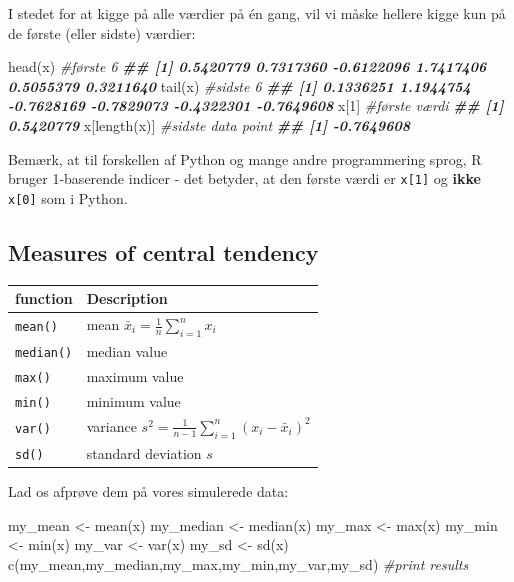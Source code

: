 \documentclass[
]{book}
\newenvironment{Shaded}{\begin{snugshade}}{\end{snugshade}}
\newcommand{\CommentTok}[1]{\textcolor[rgb]{0.56,0.35,0.01}{\textit{#1}}}
\newcommand{\DecValTok}[1]{\textcolor[rgb]{0.00,0.00,0.81}{#1}}
\newcommand{\DocumentationTok}[1]{\textcolor[rgb]{0.56,0.35,0.01}{\textbf{\textit{#1}}}}
\newcommand{\FunctionTok}[1]{\textcolor[rgb]{0.00,0.00,0.00}{#1}}
\newcommand{\NormalTok}[1]{#1}
\newcommand{\OtherTok}[1]{\textcolor[rgb]{0.56,0.35,0.01}{#1}}
\begin{document}
I stedet for at kigge på alle værdier på én gang, vil vi måske hellere kigge kun på de første (eller sidste) værdier:

\begin{Shaded}
\begin{Highlighting}[]
\FunctionTok{head}\NormalTok{(x) }\CommentTok{\#første 6}
\DocumentationTok{\#\# [1]  0.5420779  0.7317360 {-}0.6122096  1.7417406  0.5055379  0.3211640}
\FunctionTok{tail}\NormalTok{(x) }\CommentTok{\#sidste 6}
\DocumentationTok{\#\# [1]  0.1336251  1.1944754 {-}0.7628169 {-}0.7829073 {-}0.4322301 {-}0.7649608}
\NormalTok{x[}\DecValTok{1}\NormalTok{] }\CommentTok{\#første værdi}
\DocumentationTok{\#\# [1] 0.5420779}
\NormalTok{x[}\FunctionTok{length}\NormalTok{(x)] }\CommentTok{\#sidste data point}
\DocumentationTok{\#\# [1] {-}0.7649608}
\end{Highlighting}
\end{Shaded}

Bemærk, at til forskellen af Python og mange andre programmering sprog, R bruger 1-baserende indicer - det betyder, at den første værdi er \texttt{x{[}1{]}} og \textbf{ikke} \texttt{x{[}0{]}} som i Python.

\hypertarget{measures-of-central-tendency}{%
\subsection{Measures of central tendency}\label{measures-of-central-tendency}}

\begin{longtable}[]{@{}ll@{}}
\toprule
function & Description \\
\midrule
\endhead
\texttt{mean()} & mean \(\bar{x}_{i} = \frac{1}{n}\sum_{i=1}^{n} x_{i}\) \\
\texttt{median()} & median value \\
\texttt{max()} & maximum value \\
\texttt{min()} & minimum value \\
\texttt{var()} & variance \(s^2 = \frac{1}{n-1}\sum_{i=1}^{n} (x_{i} - \bar{x}_{i})^2\) \\
\texttt{sd()} & standard deviation \(s\) \\
\bottomrule
\end{longtable}

Lad os afprøve dem på vores simulerede data:

\begin{Shaded}
\begin{Highlighting}[]
\NormalTok{my\_mean }\OtherTok{\textless{}{-}} \FunctionTok{mean}\NormalTok{(x)}
\NormalTok{my\_median }\OtherTok{\textless{}{-}} \FunctionTok{median}\NormalTok{(x)}
\NormalTok{my\_max }\OtherTok{\textless{}{-}} \FunctionTok{max}\NormalTok{(x)}
\NormalTok{my\_min }\OtherTok{\textless{}{-}} \FunctionTok{min}\NormalTok{(x)}
\NormalTok{my\_var }\OtherTok{\textless{}{-}} \FunctionTok{var}\NormalTok{(x)}
\NormalTok{my\_sd }\OtherTok{\textless{}{-}} \FunctionTok{sd}\NormalTok{(x)}
\FunctionTok{c}\NormalTok{(my\_mean,my\_median,my\_max,my\_min,my\_var,my\_sd) }\CommentTok{\#print results}
\end{Highlighting}
\end{Shaded}
\end{document}
